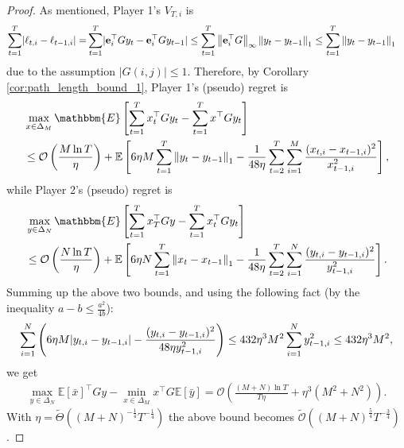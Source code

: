 \begin{proof}
As mentioned, Player 1's $V_{T,i}$ is 
\begin{align*}
\sum_{t=1}^T \lvert {\ell_{t,i}-\ell_{t-1,i}} \rvert=&\sum_{t=1}^T \lvert {\mathbf{e}_i^\top Gy_t-\mathbf{e}_i^\top Gy_{t-1}} \rvert\leq \sum_{t=1}^T \left\lVert\mathbf{e}_i^\top G\right\rVert_\infty \left\lVert y_t-y_{t-1}\right\rVert_1\leq \sum_{t=1}^T \left\lVert y_t-y_{t-1}\right\rVert_1
\end{align*}
due to the assumption $|G(i,j)|\leq 1$. Therefore, by Corollary \ref{cor:path_length_bound_1}, Player 1's (pseudo) regret is
\begin{align*}
&\max_{x \in \Delta_M} \mathbbm{E}\left[\sum_{t=1}^T x_t^\top G y_t - \sum_{t=1}^T x^\top G y_t \right] \\
&\leq \mathcal{O}\left(\frac{M\ln T}{\eta}\right) + \mathbb{E}\left[6\eta M \sum_{t=1}^T \norm{y_t-y_{t-1}}_1 -\frac{1}{48\eta}\sum_{t=2}^T \sum_{i=1}^M \frac{(x_{t,i}-x_{t-1,i})^2}{x_{t-1,i}^2} \right],%
\end{align*}
while Player 2's (pseudo) regret is
\begin{align*}
&\max_{y \in \Delta_N} \mathbbm{E}\left[\sum_{t=1}^T x_T^\top G y - \sum_{t=1}^T x_t^\top G y_t \right] \\
&\leq \mathcal{O}\left(\frac{N\ln T}{\eta}\right) + \mathbb{E}\left[6\eta N \sum_{t=1}^T \norm{x_t-x_{t-1}}_1 -\frac{1}{48\eta}\sum_{t=2}^T \sum_{i=1}^N \frac{(y_{t,i}-y_{t-1,i})^2}{y_{t-1,i}^2} \right].%
\end{align*}
Summing up the above two bounds, and using the following fact (by the inequality $a - b \leq \frac{a^2}{4b}$):
\begin{align*}
\sum_{i=1}^N \left(6\eta M \lvert {y_{t,i}-y_{t-1,i}} \rvert- \frac{(y_{t,i}-y_{t-1,i})^2}{48\eta y_{t-1,i}^2}\right)\leq 432\eta^3 M^2 \sum_{i=1}^N y_{t-1,i}^2 \leq 432\eta^3 M^2, 
\end{align*}
we get 
\begin{align*}
\max_{y \in \Delta_N}\mathbb{E}[\bar{x}]^\top Gy - \min_{x \in \Delta_M} x^\top G \mathbb{E}[\bar{y}] 
 =\mathcal{O}\left(\frac{(M+N)\ln T}{T\eta} + \eta^3 (M^2+N^2) \right).
\end{align*}
With $\eta=\tilde{\Theta}\left( (M+N)^{-\frac{1}{4}}T^{-\frac{1}{4}}\right)$ the above bound becomes $\tilde{\mathcal{O}}\left((M+N)^{\frac{5}{4}}T^{-\frac{3}{4}}\right)$.

\end{proof}
